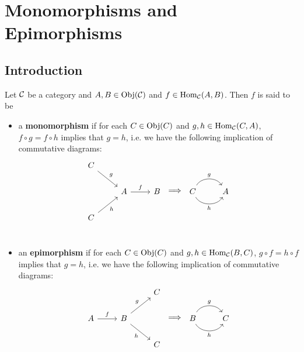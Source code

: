 \documentclass{book}
\begin{document}
	
	
	
	
	
	
	\newpage
	\section{Monomorphisms and Epimorphisms}
	
	\subsection{Introduction}
	
	\begin{defn} 
		Let $\mathcal{C}$ be a category and $A,B \in \operatorname{Obj}(\mathcal{C})$ and $f \in \operatorname{Hom}_{\mathcal{C}}(A,B)$. Then $f$ is said to be 
		\begin{itemize}
			\item 
			a \textbf{monomorphism} if for each $C \in \operatorname{Obj}(C)$ and $g,h \in \operatorname{Hom}_{\mathcal{C}}(C, A)$, $f \circ g = f \circ h$ implies that $g = h$, i.e. we have the following implication of commutative diagrams: 
			\[ 
			\begin{tikzcd}[baseline= 7]
				C \arrow[dr, "g"]&                                   & \\
				& A \arrow[r, "f"] & B  \\
				C \arrow[ur, "h"']&                                   & \\
			\end{tikzcd}
			\implies
			\begin{tikzcd}[baseline= 7]
				C \arrow[bend right=60, swap]{r}{h} \arrow[bend right=-60]{r}{g} & A  \\
			\end{tikzcd}
			\]
			\item 
			an \textbf{epimorphism} if for each $C \in \operatorname{Obj}(C)$ and $g,h \in \operatorname{Hom}_{\mathcal{C}}(B, C)$, $g \circ f = h \circ f$ implies that $g = h$, i.e. we have the following implication of commutative diagrams: \\
			\[ 
			\begin{tikzcd}[baseline= 7]
				&                                   & C \\
				A \arrow[r, "f"]  & B \arrow[ur, "g"] \arrow[dr, "h"'] &   \\
				&                                   & C \\
			\end{tikzcd}
			\implies
			\begin{tikzcd}[baseline= 7]
				B \arrow[bend right=60, swap]{r}{h} \arrow[bend right=-60]{r}{g} & C  \\
			\end{tikzcd}
			\]
		\end{itemize}
	\end{defn}
	
\end{document}
